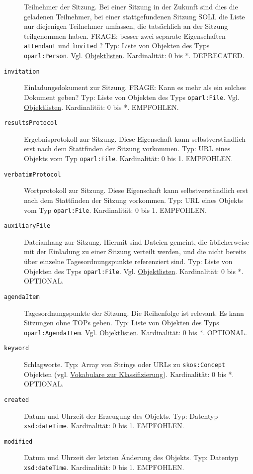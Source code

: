 \documentclass[,a4paper]{article}
\begin{document}
\begin{description}
Teilnehmer der Sitzung. Bei einer Sitzung in der Zukunft sind dies die
geladenen Teilnehmer, bei einer stattgefundenen Sitzung SOLL die Liste
nur diejenigen Teilnehmer umfassen, die tatsächlich an der Sitzung
teilgenommen haben. FRAGE: besser zwei separate Eigenschaften
\texttt{attendant} und \texttt{ìnvited} ? Typ: Liste von Objekten des
Typs \texttt{oparl:Person}. Vgl. \hyperref[objektlisten]{Objektlisten}.
Kardinalität: 0 bis *. DEPRECATED.
\item[\texttt{invitation}]
Einladungsdokument zur Sitzung. FRAGE: Kann es mehr als ein solches
Dokument geben? Typ: Liste von Objekten des Typs \texttt{oparl:File}.
Vgl. \hyperref[objektlisten]{Objektlisten}. Kardinalität: 0 bis *.
EMPFOHLEN.
\item[\texttt{resultsProtocol}]
Ergebnisprotokoll zur Sitzung. Diese Eigenschaft kann selbstverständlich
erst nach dem Stattfinden der Sitzung vorkommen. Typ: URL eines Objekts
vom Typ \texttt{oparl:File}. Kardinalität: 0 bis 1. EMPFOHLEN.
\item[\texttt{verbatimProtocol}]
Wortprotokoll zur Sitzung. Diese Eigenschaft kann selbstverständlich
erst nach dem Stattfinden der Sitzung vorkommen. Typ: URL eines Objekts
vom Typ \texttt{oparl:File}. Kardinalität: 0 bis 1. EMPFOHLEN.
\item[\texttt{auxiliaryFile}]
Dateianhang zur Sitzung. Hiermit sind Dateien gemeint, die üblicherweise
mit der Einladung zu einer Sitzung verteilt werden, und die nicht
bereits über einzelne Tagesordnungspunkte referenziert sind. Typ: Liste
von Objekten des Typs \texttt{oparl:File}. Vgl.
\hyperref[objektlisten]{Objektlisten}. Kardinalität: 0 bis *. OPTIONAL.
\item[\texttt{agendaItem}]
Tagesordnungspunkte der Sitzung. Die Reihenfolge ist relevant. Es kann
Sitzungen ohne TOPs geben. Typ: Liste von Objekten des Typs
\texttt{oparl:AgendaItem}. Vgl. \hyperref[objektlisten]{Objektlisten}.
Kardinalität: 0 bis *. OPTIONAL.
\item[\texttt{keyword}]
Schlagworte. Typ: Array von Strings oder URLs zu \texttt{skos:Concept}
Objekten (vgl. \hyperref[vokabulareux5fklassifizierung]{Vokabulare zur
Klassifizierung}). Kardinalität: 0 bis *. OPTIONAL.
\item[\texttt{created}]
Datum und Uhrzeit der Erzeugung des Objekts. Typ: Datentyp
\texttt{xsd:dateTime}. Kardinalität: 0 bis 1. EMPFOHLEN.
\item[\texttt{modified}]
Datum und Uhrzeit der letzten Änderung des Objekts. Typ: Datentyp
\texttt{xsd:dateTime}. Kardinalität: 0 bis 1. EMPFOHLEN.
\end{description}
\end{document}
